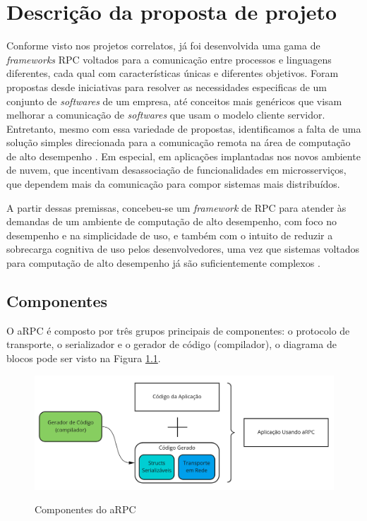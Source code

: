 \chapter{Descrição da proposta de projeto}

Conforme visto nos projetos correlatos, já foi desenvolvida uma gama de \textit{frameworks} RPC voltados para a comunicação entre processos e linguagens diferentes, cada qual com características únicas e diferentes objetivos. Foram propostas desde iniciativas para resolver as necessidades especificas de um conjunto de \emph{softwares} de um empresa, até conceitos mais genéricos que visam melhorar a comunicação de \textit{softwares} que usam o modelo cliente servidor. Entretanto, mesmo com essa variedade de propostas, identificamos a falta de uma solução simples direcionada para a comunicação remota na área de computação de alto desempenho \cite{soumagne2020advancing}. Em especial, em aplicações implantadas nos novos ambiente de nuvem, que incentivam desassociação de funcionalidades em microsserviços, que dependem mais da comunicação para compor sistemas mais distribuídos.

A partir dessas premissas, concebeu-se um \textit{framework} de RPC para atender às demandas de um ambiente de computação de alto desempenho, com foco no desempenho e na simplicidade de uso, e também com o intuito de reduzir a sobrecarga cognitiva de uso pelos desenvolvedores, uma vez que sistemas voltados para computação de alto desempenho já são suficientemente complexos \cite{lynn_addressing_2018}.

\section{Componentes}

O aRPC é composto por três grupos principais de componentes: o protocolo de transporte, o serializador e o gerador de código (compilador), o diagrama de blocos pode ser visto na Figura \ref{fig:arpc_components}.

\begin{figure}[ht]
    \centering
    \caption{Componentes do aRPC}
    \includegraphics[width=\textwidth]{figuras/diagramas/cap3/componentes.png} 
    \label{fig:arpc_components}
\end{figure}

